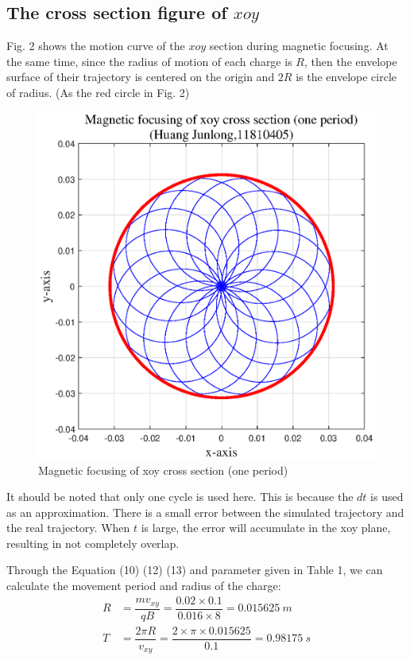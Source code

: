 \documentclass[journal,twocolumn,letterpaper]{IEEEJERM}
\begin{document}
\subsection{The cross section figure of $ xoy $ }
Fig. 2 shows the motion curve of the $ xoy $ section during magnetic focusing. At the same time, since the radius of motion of each charge is $ R $, then the envelope surface of their trajectory is centered on the origin and $ 2R $ is the envelope circle of radius. (As the red circle in Fig. 2)
\begin{figure}[H]   
	\centering	        \includegraphics[width=0.9\linewidth]{Fig-2-1.eps}
	\caption{Magnetic focusing of xoy cross section (one period)}	  
	\label{fig2} 
\end{figure}

It should be noted that only one cycle is used here. This is because the $ dt $ is used as an approximation. There is a small error between the simulated trajectory and the real trajectory. When $ t $ is large, the error will accumulate in the xoy plane, resulting in not completely overlap.

Through the Equation (10) (12) (13) and parameter given in  Table 1, we can calculate the movement period and radius of the charge:
\begin{align}
R&=\dfrac{mv_{xy}}{qB}=\dfrac{0.02\times 0.1}{0.016\times 8}=0.015625\ m\\
T&=\dfrac{2\pi R}{v_{xy}}=\dfrac{2\times \pi\times 0.015625}{0.1}=0.98175\ s
\end{align}
\end{document}
